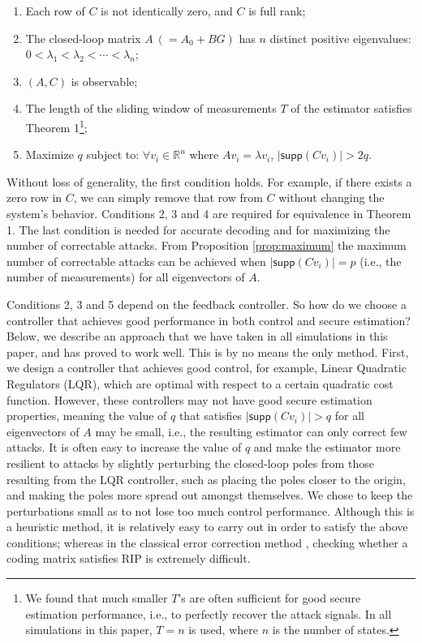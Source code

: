 \documentclass[../../thesis.tex]{subfiles}
\begin{document}
\begin{enumerate}
	\item Each row of $C$ is not identically zero, and $C$ is full rank;
	\item The closed-loop matrix $A~(=A_0+BG)$ has $n$ distinct positive eigenvalues: $0< \lambda_1 < \lambda_2 < \cdots < \lambda _n$;
	\item $(A,C)$ is observable;
	\item The length of the sliding window of measurements $T$ of the estimator satisfies Theorem 1\footnote{We found that much smaller $T$'s are often sufficient for good secure estimation performance, i.e., to perfectly recover the attack signals. In all simulations in this paper, $T=n$ is used, where $n$ is the number of states.};
	\item Maximize $q$ subject to: $\forall v_i \in \mathbb{R}^n$ where $Av_i = \lambda v_i$, $\lvert \textsf{supp} (C v_i)  \rvert > 2q$.
\end{enumerate}
Without loss of generality, the first condition holds. For example, if there exists a zero row in $C$, we can simply remove that row from $C$ without changing the system's behavior. Conditions 2, 3 and 4 are required for equivalence in Theorem 1. The last condition is needed for accurate decoding and for maximizing the number of correctable attacks. From Proposition \ref{prop:maximum} the maximum number of correctable attacks can be achieved when $\lvert \textsf{supp} (C v_i)  \rvert = p$ (i.e., the number of measurements) for all eigenvectors of $A$. 

Conditions 2, 3 and 5 depend on the feedback controller. So how do we choose a controller that achieves good performance in both control and secure estimation? Below, we describe an approach that we have taken in all simulations in this paper, and has proved to work well. This is by no means the only method. First, we design a controller that achieves good control, for example, Linear Quadratic Regulators (LQR), which are optimal with respect to a certain quadratic cost function. However, these controllers may not have good secure estimation properties, meaning the value of $q$ that satisfies $\lvert \textsf{supp} (C v_i) \rvert > q$ for all eigenvectors of $A$ may be small, i.e., the resulting estimator can only correct few attacks. It is often easy to increase the value of $q$ and make the estimator more resilient to attacks by slightly perturbing the closed-loop poles from those resulting from the LQR controller, such as placing the poles closer to the origin, and making the poles more spread out amongst themselves. We chose to keep the perturbations small as to not lose too much control performance.  
Although this is a heuristic method, it is relatively easy to carry out in order to satisfy the above conditions; whereas in the classical error correction method \cite{Candes_Tao}, checking whether a coding matrix satisfies RIP is extremely difficult.
\end{document}
